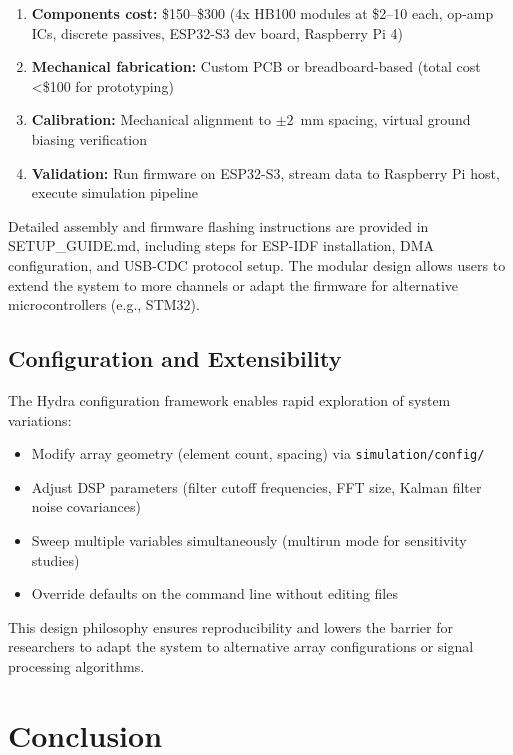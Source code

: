 \documentclass[10pt,a4paper]{article}
\begin{document}
\begin{enumerate}
\item \textbf{Components cost:} \$150--\$300 (4x HB100 modules at \$2--10 each, op-amp ICs, discrete passives, ESP32-S3 dev board, Raspberry Pi 4)
\item \textbf{Mechanical fabrication:} Custom PCB or breadboard-based (total cost \textless\$100 for prototyping)
\item \textbf{Calibration:} Mechanical alignment to $\pm 2$~mm spacing, virtual ground biasing verification
\item \textbf{Validation:} Run firmware on ESP32-S3, stream data to Raspberry Pi host, execute simulation pipeline
\end{enumerate}

Detailed assembly and firmware flashing instructions are provided in SETUP\_GUIDE.md, including steps for ESP-IDF installation,
DMA configuration, and USB-CDC protocol setup. The modular design allows users to extend the system to more channels
or adapt the firmware for alternative microcontrollers (e.g., STM32).

\subsection{Configuration and Extensibility}

The Hydra configuration framework enables rapid exploration of system variations:

\begin{itemize}
\item Modify array geometry (element count, spacing) via \texttt{simulation/config/}
\item Adjust DSP parameters (filter cutoff frequencies, FFT size, Kalman filter noise covariances)
\item Sweep multiple variables simultaneously (multirun mode for sensitivity studies)
\item Override defaults on the command line without editing files
\end{itemize}

This design philosophy ensures reproducibility and lowers the barrier for researchers to adapt the system
to alternative array configurations or signal processing algorithms.

\section{Conclusion}
\label{sec:conclusion}
\end{document}
